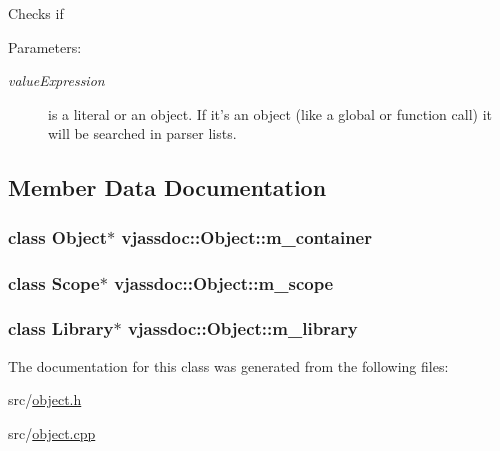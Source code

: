 Checks if \begin{Desc}
\item[Parameters:]
\begin{description}
\item[{\em valueExpression}]is a literal or an object. If it's an object (like a global or function call) it will be searched in parser lists. \end{description}
\end{Desc}


\subsection{Member Data Documentation}
\hypertarget{classvjassdoc_1_1Object_c14bc17d0da694e343812eed35883859}{
\subsubsection{\setlength{\rightskip}{0pt plus 5cm}class {\bf Object}$\ast$ {\bf vjassdoc::Object::m\_\-container}}}
\label{classvjassdoc_1_1Object_c14bc17d0da694e343812eed35883859}


\hypertarget{classvjassdoc_1_1Object_e807f9d1a84a2708976d07b21a17cf81}{
\subsubsection{\setlength{\rightskip}{0pt plus 5cm}class {\bf Scope}$\ast$ {\bf vjassdoc::Object::m\_\-scope}}}
\label{classvjassdoc_1_1Object_e807f9d1a84a2708976d07b21a17cf81}


\hypertarget{classvjassdoc_1_1Object_90d88574b7a542deb45e65a9242b345a}{
\subsubsection{\setlength{\rightskip}{0pt plus 5cm}class {\bf Library}$\ast$ {\bf vjassdoc::Object::m\_\-library}}}
\label{classvjassdoc_1_1Object_90d88574b7a542deb45e65a9242b345a}




The documentation for this class was generated from the following files:\begin{CompactItemize}
\item 
src/\hyperlink{object_8h}{object.h}\item 
src/\hyperlink{object_8cpp}{object.cpp}\end{CompactItemize}
